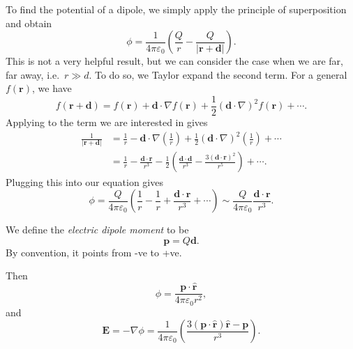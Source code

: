 \documentclass[a4paper]{article}
\begin{document}
To find the potential of a dipole, we simply apply the principle of superposition and obtain
\[
  \phi = \frac{1}{4\pi\varepsilon_0}\left(\frac{Q}{r} - \frac{Q}{|\mathbf{r} + \mathbf{d}|}\right).
\]
This is not a very helpful result, but we can consider the case when we are far, far away, i.e.\ $r \gg d$. To do so, we Taylor expand the second term. For a general $f(\mathbf{r})$, we have
\[
  f(\mathbf{r} + \mathbf{d}) = f(\mathbf{r}) + \mathbf{d}\cdot \nabla f(\mathbf{r}) + \frac{1}{2}(\mathbf{d}\cdot \nabla)^2f(\mathbf{r}) + \cdots.
\]
Applying to the term we are interested in gives
\begin{align*}
  \frac{1}{|\mathbf{r} + \mathbf{d}|} &= \frac{1}{r} - \mathbf{d}\cdot \nabla\left(\frac{1}{r}\right) + \frac{1}{2}(\mathbf{d}\cdot \nabla)^2\left(\frac{1}{r}\right) + \cdots\\
  &= \frac{1}{r} - \frac{\mathbf{d}\cdot \mathbf{r}}{r^3} - \frac{1}{2}\left(\frac{\mathbf{d}\cdot \mathbf{d}}{r^3} - \frac{3(\mathbf{d}\cdot \mathbf{r})^2}{r^5}\right) + \cdots.
\end{align*}
Plugging this into our equation gives
\[
  \phi = \frac{Q}{4\pi\varepsilon_0}\left(\frac{1}{r} - \frac{1}{r} + \frac{\mathbf{d}\cdot \mathbf{r}}{r^3} + \cdots\right) \sim \frac{Q}{4\pi\varepsilon_0} \frac{\mathbf{d}\cdot \mathbf{r}}{r^3}.
\]
\begin{defi}
  We define the \emph{electric dipole moment} to be
  \[
    \mathbf{p} = Q\mathbf{d}.
  \]
  By convention, it points from -ve to +ve.
\end{defi}
Then
\[
  \phi = \frac{\mathbf{p}\cdot \hat{\mathbf{r}}}{4\pi\varepsilon_0 r^2},
\]
and
\[
  \mathbf{E} = -\nabla\phi = \frac{1}{4\pi\varepsilon_0}\left(\frac{3(\mathbf{p}\cdot\hat{\mathbf{r}})\hat{\mathbf{r}} - \mathbf{p}}{r^3}\right).
\]
\end{document}
